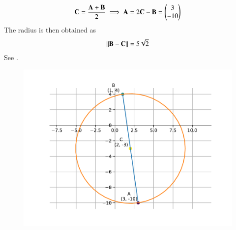 	\begin{align}
	\mathbf{C} = \frac{\mathbf{A+B}}{2} 
	\implies 	\mathbf{A} = 2\mathbf{C}-\mathbf{B} 
	 = \begin{pmatrix}3\\-10\\\end{pmatrix}	
	\end{align}       
	The radius is then obtained as
\begin{align}
	\left\lVert\mathbf{B}-\mathbf{C}\right\rVert = 5\sqrt{2}
\end{align}
	See 
.
\begin{figure}[H]
\begin{center}	
	\includegraphics[width=0.75\columnwidth]{chapters/10/7/2/7/figs/fig.pdf}
\end{center}
\caption{}
\label{fig:chapters/10/7/2/7Fig}
\end{figure}
	
